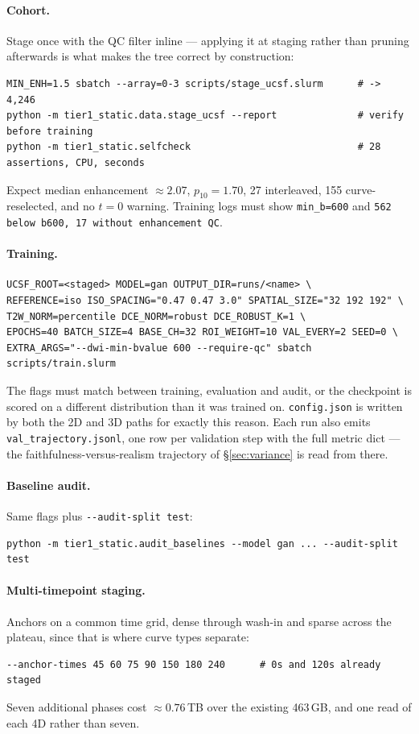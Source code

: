 \documentclass[11pt]{article}
\newcommand{\1}{\mathbb{1}}
\begin{document}
\paragraph{Cohort.} Stage once with the QC filter inline --- applying it at staging rather
than pruning afterwards is what makes the tree correct by construction:
\begin{verbatim}
MIN_ENH=1.5 sbatch --array=0-3 scripts/stage_ucsf.slurm      # -> 4,246
python -m tier1_static.data.stage_ucsf --report              # verify before training
python -m tier1_static.selfcheck                             # 28 assertions, CPU, seconds
\end{verbatim}
Expect median enhancement $\approx2.07$, $p_{10}=1.70$, 27 interleaved, 155 curve-reselected,
and no $t{=}0$ warning. Training logs must show \texttt{min\_b=600} and
\texttt{562 below b600, 17 without enhancement QC}.

\paragraph{Training.}
\begin{verbatim}
UCSF_ROOT=<staged> MODEL=gan OUTPUT_DIR=runs/<name> \
REFERENCE=iso ISO_SPACING="0.47 0.47 3.0" SPATIAL_SIZE="32 192 192" \
T2W_NORM=percentile DCE_NORM=robust DCE_ROBUST_K=1 \
EPOCHS=40 BATCH_SIZE=4 BASE_CH=32 ROI_WEIGHT=10 VAL_EVERY=2 SEED=0 \
EXTRA_ARGS="--dwi-min-bvalue 600 --require-qc" sbatch scripts/train.slurm
\end{verbatim}
The flags must match between training, evaluation and audit, or the checkpoint is scored on a
different distribution than it was trained on. \texttt{config.json} is written by both the 2D
and 3D paths for exactly this reason. Each run also emits
\texttt{val\_trajectory.jsonl}, one row per validation step with the full metric dict --- the
faithfulness-versus-realism trajectory of \S\ref{sec:variance} is read from there.

\paragraph{Baseline audit.} Same flags plus \texttt{-{}-audit-split test}:
\begin{verbatim}
python -m tier1_static.audit_baselines --model gan ... --audit-split test
\end{verbatim}

\paragraph{Multi-timepoint staging.} Anchors on a common time grid, dense through wash-in and
sparse across the plateau, since that is where curve types separate:
\begin{verbatim}
--anchor-times 45 60 75 90 150 180 240      # 0s and 120s already staged
\end{verbatim}
Seven additional phases cost $\approx0.76$\,TB over the existing 463\,GB, and one read of
each 4D rather than seven.
\end{document}
